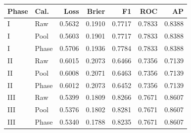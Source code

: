 \begin{tabular}{llrrrrr}
\toprule
Phase & Cal. & Loss & Brier & F1 & ROC & AP \\
\midrule
I & Raw & 0.5632 & 0.1910 & 0.7717 & 0.7833 & 0.8388 \\
I & Pool & 0.5603 & 0.1901 & 0.7717 & 0.7833 & 0.8388 \\
I & Phase & 0.5706 & 0.1936 & 0.7784 & 0.7833 & 0.8388 \\
II & Raw & 0.6015 & 0.2073 & 0.6466 & 0.7356 & 0.7139 \\
II & Pool & 0.6008 & 0.2071 & 0.6463 & 0.7356 & 0.7139 \\
II & Phase & 0.6012 & 0.2073 & 0.6452 & 0.7356 & 0.7139 \\
III & Raw & 0.5399 & 0.1809 & 0.8266 & 0.7671 & 0.8607 \\
III & Pool & 0.5376 & 0.1802 & 0.8281 & 0.7671 & 0.8607 \\
III & Phase & 0.5340 & 0.1788 & 0.8235 & 0.7671 & 0.8607 \\
\bottomrule
\end{tabular}
